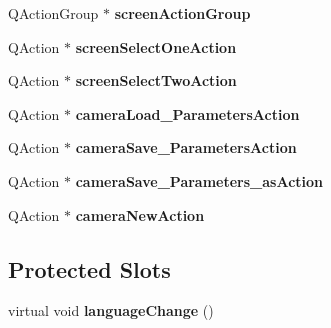 \begin{DoxyCompactItemize}
\item 
Q\+Action\+Group $\ast$ {\bfseries screen\+Action\+Group}\hypertarget{classcalibrador_adfa68013fab2591b9be94466733bedd7}{}\label{classcalibrador_adfa68013fab2591b9be94466733bedd7}

\item 
Q\+Action $\ast$ {\bfseries screen\+Select\+One\+Action}\hypertarget{classcalibrador_ae539f51db1eaa8a40f2e401ec4a96be1}{}\label{classcalibrador_ae539f51db1eaa8a40f2e401ec4a96be1}

\item 
Q\+Action $\ast$ {\bfseries screen\+Select\+Two\+Action}\hypertarget{classcalibrador_aa57fcf91d0628a47bf537515ead66f52}{}\label{classcalibrador_aa57fcf91d0628a47bf537515ead66f52}

\item 
Q\+Action $\ast$ {\bfseries camera\+Load\+\_\+\+Parameters\+Action}\hypertarget{classcalibrador_aa2836ccc88ae2923ce0bdb43cd72f854}{}\label{classcalibrador_aa2836ccc88ae2923ce0bdb43cd72f854}

\item 
Q\+Action $\ast$ {\bfseries camera\+Save\+\_\+\+Parameters\+Action}\hypertarget{classcalibrador_ac170ad7c9d457b82e27e6607f5631c59}{}\label{classcalibrador_ac170ad7c9d457b82e27e6607f5631c59}

\item 
Q\+Action $\ast$ {\bfseries camera\+Save\+\_\+\+Parameters\+\_\+as\+Action}\hypertarget{classcalibrador_a50520cafa000751352eb82cc369b0f3e}{}\label{classcalibrador_a50520cafa000751352eb82cc369b0f3e}

\item 
Q\+Action $\ast$ {\bfseries camera\+New\+Action}\hypertarget{classcalibrador_a531b88ad0e2da466d8c67a7c313b13ed}{}\label{classcalibrador_a531b88ad0e2da466d8c67a7c313b13ed}

\end{DoxyCompactItemize}
\subsection*{Protected Slots}
\begin{DoxyCompactItemize}
\item 
virtual void {\bfseries language\+Change} ()\hypertarget{classcalibrador_ad1c97bc0c5daec577b156ddda094af1c}{}\label{classcalibrador_ad1c97bc0c5daec577b156ddda094af1c}

\end{DoxyCompactItemize}
